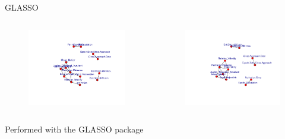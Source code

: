 \documentclass{beamer}
\begin{document}
\begin{frame}{GLASSO}
\begin{columns}
  \begin{figure}[b]{\textwidth}
    \centering
    \includegraphics[width=\textwidth]{Pic/GLASSO_0.3.pdf}
  \end{figure} 
  \begin{figure}[b]{\textwidth}
    \centering
    \includegraphics[width=\textwidth]{Pic/GLASSO_0.4.pdf}
  \end{figure}
\end{columns}
\begin{center}
Performed with the GLASSO package \cite{glasso}
\end{center}
\end{frame}
\end{document}
